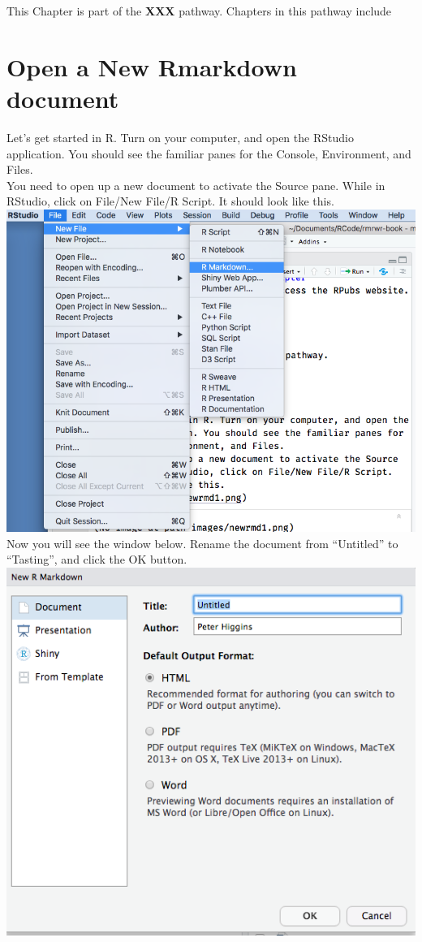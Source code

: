 \documentclass[
]{book}
\begin{document}
This Chapter is part of the \textbf{XXX} pathway.
Chapters in this pathway include

\hypertarget{open-a-new-rmarkdown-document}{%
\section{Open a New Rmarkdown document}\label{open-a-new-rmarkdown-document}}

Let's get started in R. Turn on your computer, and open the RStudio application. You should see the familiar panes for the Console, Environment, and Files.\\
You need to open up a new document to activate the Source pane. While in RStudio, click on File/New File/R Script.
It should look like this.\\
\includegraphics{images/rmd1.png}
Now you will see the window below. Rename the document from ``Untitled'' to ``Tasting'', and click the OK button.
\includegraphics{images/rmd2.png}
\end{document}
